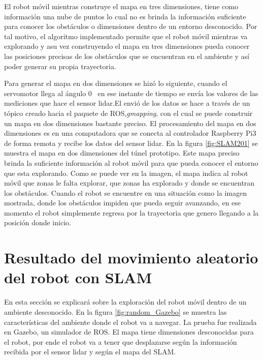 El robot móvil mientras construye el mapa en tres dimensiones, tiene como información una nube 
de puntos lo cual no es brinda la información suficiente para conocer los obstáculos o 
dimensiones dentro de un entorno desconocido. Por tal motivo, el algoritmo implementado permite 
que el robot móvil mientras va explorando y asu vez construyendo el mapa en tres dimensiones 
pueda conocer las posiciones precisas de los obstáculos que se encuentran en el ambiente y así 
poder generar su propia trayectoria.

Para generar el mapa en dos dimensiones se hizó lo siguiente, cuando el servomotor llega al ángulo
0\grad~ en ese instante de tiempo se envía los valores de las mediciones que hace el sensor lidar.El
envió de los datos se hace a través de un tópico creado hacia el paquete de ROS,\textit{gmapping}, 
con el cual se puede construir un mapa en dos dimensiones bastante preciso. El procesamiento del 
mapa en dos dimensiones es en una computadora que se conecta al controlador Raspberry Pi3 de forma 
remota y recibe los datos del sensor lidar. En la figura \ref{fig:SLAM201} se muestra el mapa en 
dos dimensiones del túnel prototipo. Este mapa preciso brinda la suficiente información al robot  
móvil para que pueda conocer el entorno que esta explorando. Como se puede ver en la imagen, el 
mapa indica al robot móvil que zonas le falta explorar, que zonas ha explorado y donde se 
encuentran los obstáculos. Cuando el robot se encuentre en una situación como la imagen mostrada, 
donde los obstáculos impiden que pueda seguir avanzando, en ese momento el robot simplemente regresa 
por la trayectoria que genero llegando a la posición donde inicio.
 


\section{Resultado del movimiento aleatorio del robot con SLAM}

En esta sección se explicará sobre la exploración del robot móvil dentro de un ambiente 
desconocido. En la figura \ref{fig:random_Gazebo} se muestra las características del ambiente 
donde el robot va a navegar. La prueba fue realizada en Gazebo, un simulador de ROS. El mapa 
tiene dimensiones desconocidas para el robot, por ende el robot va a tener que desplazarse 
según la información recibida por el sensor lidar y según el mapa del SLAM.

